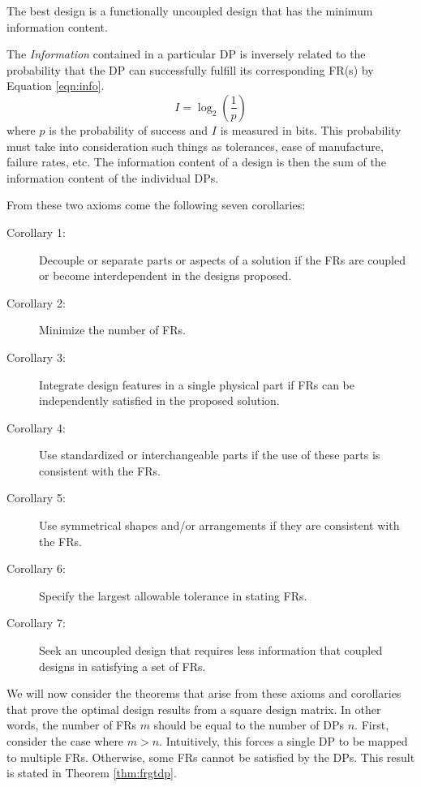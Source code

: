\begin{axiom}[Information]
  The best design is a functionally uncoupled design that has the minimum information content.
\end{axiom}

The \emph{Information} contained in a particular DP is inversely related to the probability that the DP can
successfully fulfill its corresponding FR(s) by Equation \ref{eqn:info}.
\begin{equation}
  \label{eqn:info}
  I=\log_2\left(\frac{1}{p}\right)
\end{equation}
where \(p\) is the probability of success and \(I\) is measured in bits.  This probability must take into
consideration such things as tolerances, ease of manufacture, failure rates, etc.  The information content of a
design is then the sum of the information content of the individual DPs.

From these two axioms come the following seven corollaries:
\begin{description}
\item[Corollary 1:] Decouple or separate parts or aspects of a solution if the FRs are coupled or become
  interdependent in the designs proposed.
\item[Corollary 2:] Minimize the number of FRs.
\item[Corollary 3:] \label{cor:integrate} Integrate design features in a single physical part if FRs can be
  independently satisfied in the proposed solution.
\item[Corollary 4:] Use standardized or interchangeable parts if the use of these parts is consistent with the FRs.
\item[Corollary 5:] Use symmetrical shapes and/or arrangements if they are consistent with the FRs.
\item[Corollary 6:] Specify the largest allowable tolerance in stating FRs.
\item[Corollary 7:] Seek an uncoupled design that requires less information that coupled designs in satisfying a
  set of FRs.
\end{description}

We will now consider the theorems that arise from these axioms and corollaries that prove the optimal design results
from a square design matrix.  In other words, the number of FRs \(m\) should be equal to the number of DPs \(n\).
First, consider the case where \(m>n\).  Intuitively, this forces a single DP to be mapped to multiple FRs.
Otherwise, some FRs cannot be satisfied by the DPs.  This result is stated in Theorem \ref{thm:frgtdp}.

